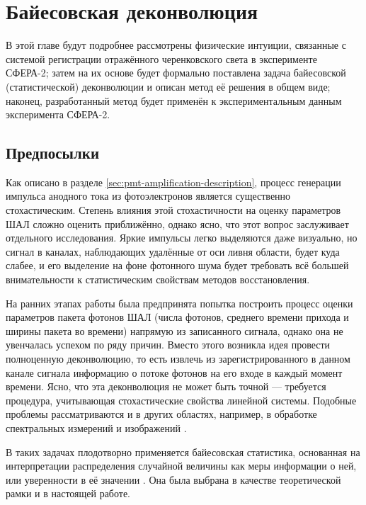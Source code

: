 \chapter{Байесовская деконволюция}

\label{chapt:bayesian-deconvolution}

В этой главе будут подробнее рассмотрены физические интуиции, связанные с системой регистрации отражённого черенковского света в эксперименте СФЕРА-2; затем на их основе будет формально поставлена задача байесовской (статистической) деконволюции и описан метод её решения в общем виде; наконец, разработанный метод будет применён к экспериментальным данным эксперимента СФЕРА-2.

\section{Предпосылки}

Как описано в разделе \ref{sec:pmt-amplification-description}, процесс генерации импульса анодного тока из фотоэлектронов является существенно стохастическим. Степень влияния этой стохастичности на оценку параметров ШАЛ сложно оценить приближённо, однако ясно, что этот вопрос заслуживает отдельного исследования. Яркие импульсы легко выделяются даже визуально, но сигнал в каналах, наблюдающих удалённые от оси ливня области, будет куда слабее, и его выделение на фоне фотонного шума будет требовать всё большей внимательности к статистическим свойствам методов восстановления.

На ранних этапах работы была предпринята попытка построить процесс оценки параметров пакета фотонов ШАЛ (числа фотонов, среднего времени прихода и ширины пакета во времени) напрямую из записанного сигнала, однако она не увенчалась успехом по ряду причин. Вместо этого возникла идея провести полноценную деконволюцию, то есть извлечь из зарегистрированного в данном канале сигнала информацию о потоке фотонов на его входе в каждый момент времени. Ясно, что эта деконволюция не может быть точной --- требуется процедура, учитывающая стохастические свойства линейной системы. Подобные проблемы рассматриваются и в других областях, например, в обработке спектральных измерений \cite{Rhode1993} и изображений \cite{Wipf2013}.

В таких задачах плодотворно применяется байесовская статистика, основанная на интерпретации распределения случайной величины как меры информации о ней, или уверенности в её значении \cite{Gelman2013}. Она была выбрана в качестве теоретической рамки и в настоящей работе.

